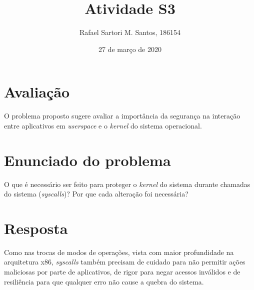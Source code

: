 \documentclass[brazilian,a4paper]{article}
\title{Atividade S3}
\author{Rafael Sartori M. Santos, 186154}
\date{27 de março de 2020}
\begin{document}
\maketitle

\section*{Avaliação}

O problema proposto sugere avaliar a importância da segurança na interação entre aplicativos em \textit{userspace} e o \textit{kernel} do sistema operacional.

\section*{Enunciado do problema}

O que é necessário ser feito para proteger o \textit{kernel} do sistema durante chamadas do sistema (\textit{syscalls})? Por que cada alteração foi necessária?

\section*{Resposta}

Como nas trocas de modos de operações, vista com maior profundidade na arquitetura x86, \textit{syscalls} também precisam de cuidado para não permitir ações maliciosas por parte de aplicativos, de rigor para negar acessos inválidos e de resiliência para que qualquer erro não cause a quebra do sistema.
\end{document}
